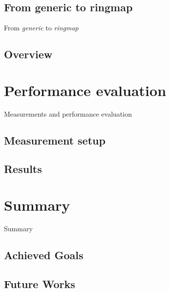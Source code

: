 \documentclass{beamer}
\begin{document}
\subsection*{From generic to ringmap}
\begin{frame}
	\begin{center}
		\huge{From \emph{generic} to \emph{ringmap}}
	\end{center}
\end{frame}


\subsection*{Overview}



%


\section{Performance evaluation}
\begin{frame}
	\begin{center}
	\huge{Measurements and performance evaluation}
	\end{center}
\end{frame}

\subsection*{Measurement setup}


\subsection*{Results}



%


\section{Summary}
\begin{frame}
	\begin{center}
	\huge{Summary}
	\end{center}
\end{frame}

\subsection*{Achieved Goals}


\subsection*{Future Works}

\end{document}
